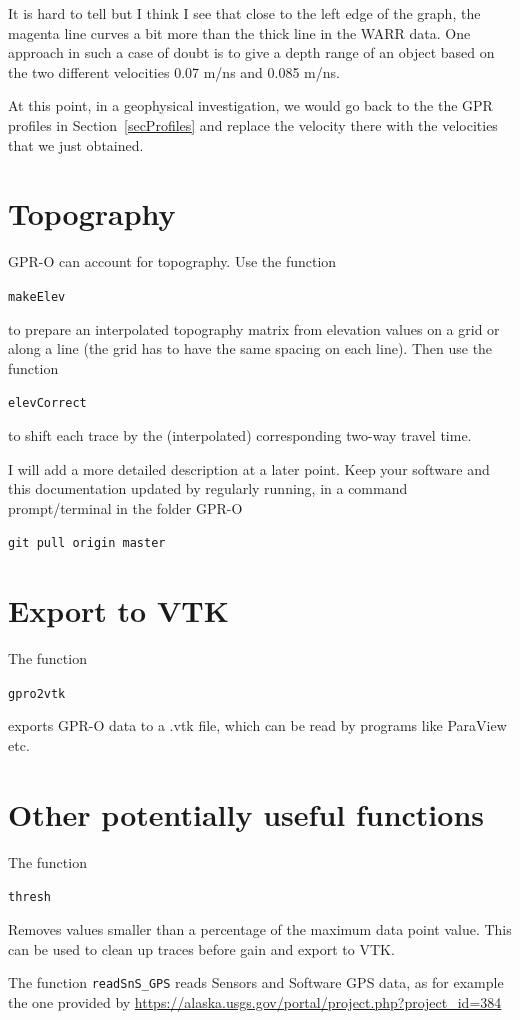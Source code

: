 \documentclass[11pt]{article}
\begin{document}
It is hard to tell but I think I see that close to the left edge of
the graph, the magenta line curves a bit more than the thick line in
the WARR data.  One approach in such a case of doubt is to give a
depth range of an object based on the two different velocities 0.07
m/ns and 0.085 m/ns.

At this point, in a geophysical investigation, we would go back to the
the GPR profiles in Section~\ref{secProfiles} and replace the velocity
there with the velocities that we just obtained.

\section{Topography}

GPR-O can account for topography. Use the function

\qquad \verb#makeElev#

to prepare an interpolated topography matrix from elevation values on
a grid or along a line (the grid has to have the same spacing on each
line). Then use the function

\qquad \verb#elevCorrect#

to shift each trace by the (interpolated) corresponding two-way travel
time.

I will add a more detailed description at a later point. Keep your
software and this documentation updated by regularly running, in a
command prompt/terminal in the folder GPR-O

\qquad \verb#git pull origin master#

\section{Export to VTK}

The function

\qquad \verb#gpro2vtk#

exports GPR-O data to a .vtk file, which can be
read by programs like ParaView etc.

\section{Other potentially useful functions}

The function

\qquad \verb#thresh#

Removes values smaller than a percentage of the maximum data point
value. This can be used to clean up traces before gain and export to VTK.

The function \verb#readSnS_GPS# reads Sensors and Software GPS data,
as for example the one provided by \url{https://alaska.usgs.gov/portal/project.php?project_id=384} 
\end{document}
